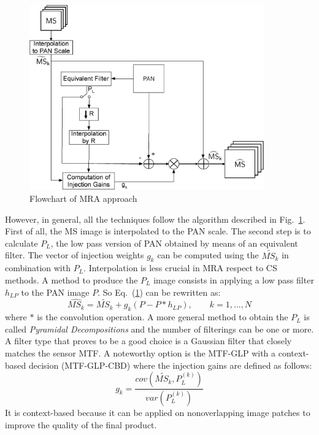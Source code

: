 \documentclass[12pt]{report}
\begin{document}
\begin{figure}[t!]
\centering
\includegraphics[width=0.9\textwidth]{mra.png}
\caption{Flowchart of MRA approach \cite{criticalComparison}}
\label{fig:mraapproach}
\end{figure}

However, in general, all the techniques follow the algorithm described in Fig.~\ref{fig:mraapproach}. 
First of all, the MS image is interpolated to the PAN scale.
The second step is to calculate $P_L$, the low pass version of PAN obtained by means of an equivalent filter.
The vector of injection weights $g_k$ can be computed using the $\widetilde{MS_k}$ in combination with $P_L$.
Interpolation is less crucial in MRA respect to CS methods.
A method to produce the $P_L$ image consists in applying a low pass filter $h_{LP}$ to the PAN image $P$.
So Eq.~(\ref{fig:mraapproach}) can be rewritten as:
%
\begin{equation}
    \widehat{MS_k} = \widetilde{MS_k} + g_k(P-P*h_{LP}), \qquad k=1,\dots,N
    \label{mra1}
\end{equation}
%
where $*$ is the convolution operation.
A more general method to obtain the $P_L$ is called \textit{Pyramidal Decompositions} and the number of 
filterings can be one or more. A filter type that proves to be a good choice is a Gaussian filter that closely 
matches the sensor MTF. A noteworthy option is the MTF-GLP with a context-based decision (MTF-GLP-CBD) \cite{mtfglp}
where the injection gains are defined as follows: 
%
\begin{equation}
    g_k = \frac{cov(\widetilde{MS_k}, P_L^{(k)})}{var(P_L^{(k)})}
    \label{mragk}
\end{equation}
 It is context-based because it can be applied on nonoverlapping image patches to improve the quality of the final product.
\end{document}

